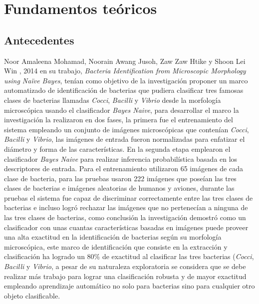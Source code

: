 \chapter{Fundamentos te\'oricos}

\section{Antecedentes}

Noor Amaleena Mohamad, Noorain Awang Jusoh, Zaw Zaw Htike y Shoon
Lei Win , 2014 en su trabajo, \textit{ Bacteria Identification from Microscopic Morphology using Naïve Bayes}, tenían como  objetivo de la investigación  proponer un marco automatizado de identificación de bacterias que pudiera clasificar tres famosas clases de bacterias llamadas  \textit{Cocci}, \textit{Bacilli} y  \textit{Vibrio} desde la morfología microscópica usando el clasificador \textit{Bayes Naive}, para desarrollar el marco la investigación la realizaron en dos fases, la primera fue el entrenamiento del sistema empleando un  conjunto de imágenes microscópicas que contenían  \textit{Cocci},  \textit{Bacilli} y  \textit{Vibrio}, las imágenes de entrada fueron normalizadas para enfatizar el diámetro y forma de las características. En la segunda etapa emplearon el clasificador \textit{Bayes Naive} para realizar inferencia probabilística basada en los descriptores de entrada. Para el entrenamiento  utilizaron 65 imágenes de cada clase de bacteria, para las pruebas usaron 222 imágenes que poseían las tres clases de bacterias e imágenes aleatorias de humanos y aviones, durante las pruebas el sistema fue capaz de discriminar correctamente entre las tres clases de bacterias e incluso logró rechazar las imágenes que no pertenecían a ninguna de las tres clases de bacterias, como conclusión la investigación demostró como un clasificador con unas cuantas características basadas en imágenes puede proveer una alta exactitud en la identificación de bacterias según su morfología microscópica, este marco de identificación que consiste en la extracción y clasificación ha logrado un 80\% de exactitud al clasificar las tres bacterias (\textit{Cocci},  \textit{Bacilli} y  \textit{Vibrio}, a pesar de su naturaleza exploratoria se considera que se debe realizar más trabajo para lograr una clasificación robusta y de mayor exactitud empleando aprendizaje automático no solo para bacterias sino para cualquier otro objeto clasificable.\\

